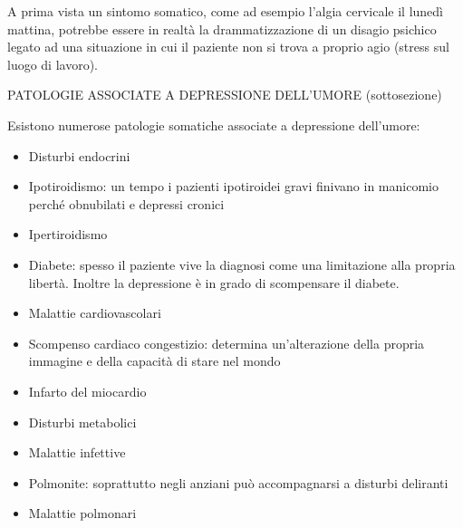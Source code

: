 \documentclass[]{article}
\begin{document}
A prima vista un sintomo somatico, come ad esempio l'algia cervicale il
lunedì mattina, potrebbe essere in realtà la drammatizzazione di un
disagio psichico legato ad una situazione in cui il paziente non si
trova a proprio agio (stress sul luogo di lavoro).

PATOLOGIE ASSOCIATE A DEPRESSIONE DELL'UMORE (sottosezione)

Esistono numerose patologie somatiche associate a depressione
dell'umore:

\begin{itemize}
\item
  Disturbi endocrini
\end{itemize}

\begin{itemize}
\item
  Ipotiroidismo: un tempo i pazienti ipotiroidei gravi finivano in
  manicomio perché obnubilati e depressi cronici
\item
  Ipertiroidismo
\item
  Diabete: spesso il paziente vive la diagnosi come una limitazione alla
  propria libertà. Inoltre la depressione è in grado di scompensare il
  diabete.
\end{itemize}

\begin{itemize}
\item
  Malattie cardiovascolari
\end{itemize}

\begin{itemize}
\item
  Scompenso cardiaco congestizio: determina un'alterazione della propria
  immagine e della capacità di stare nel mondo
\item
  Infarto del miocardio
\end{itemize}

\begin{itemize}
\item
  Disturbi metabolici
\item
  Malattie infettive
\end{itemize}

\begin{itemize}
\item
  Polmonite: soprattutto negli anziani può accompagnarsi a disturbi
  deliranti
\end{itemize}

\begin{itemize}
\item
  Malattie polmonari
\end{itemize}
\end{document}
